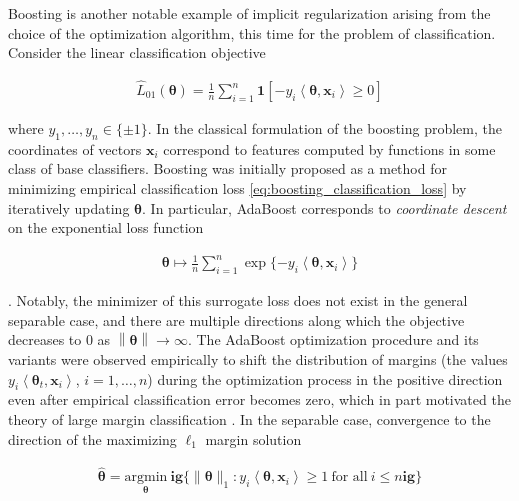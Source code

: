 Boosting is another notable example of implicit regularization arising from the choice of the optimization algorithm, this time for the problem of classification. Consider the linear classification objective

\begin{align}
	\label{eq:boosting_classification_loss}
	\widehat{L}_{01}({\boldsymbol \theta}) = \frac{1}{n}\sum_{i=1}^n
    \ensuremath{\boldsymbol{1}\left[-y_i \left\langle {\boldsymbol \theta}, {\boldsymbol x}_i \right\rangle \ge 0\right]}
\end{align}

where $y_1,\ldots,y_n\in\{\pm1\}$. In the classical formulation of the boosting problem, the coordinates of vectors ${\boldsymbol x}_i$ correspond to features computed by functions in some class of base classifiers. Boosting was initially proposed as a method for minimizing empirical classification loss \eqref{eq:boosting_classification_loss} by iteratively updating ${\boldsymbol \theta}$. In particular, AdaBoost \cite{fs-dgolab-97} corresponds to \emph{coordinate descent} on the exponential loss function

\begin{align}
	\label{eq:explosssurrogate}
	{\boldsymbol \theta}\mapsto\frac{1}{n}\sum_{i=1}^n \exp\{-y_i \left\langle {\boldsymbol \theta},{\boldsymbol x}_i \right\rangle\}
\end{align}

 
\cite{b-ac-98,friedman2001}. Notably, the minimizer of this surrogate loss does not exist in the general separable case, and there are multiple directions along which the objective decreases to $0$ as
$\left\|{\boldsymbol \theta}\right\|\to\infty$. The AdaBoost optimization procedure and its variants were observed empirically to shift the distribution of margins (the values $y_i\left\langle {\boldsymbol \theta}_t,{\boldsymbol x}_i \right\rangle$, $i=1,\ldots,n$)
during the optimization process in the positive direction even after empirical classification error becomes zero, which in part motivated the theory of large margin classification \cite{schapire1998boosting}. In the separable case, convergence to the direction of the maximizing $\ell_1$ margin solution

\begin{align}
	\label{eq:min_norm_linear_l1}
	\widehat{{\boldsymbol \theta}} = \underset{{\boldsymbol \theta}}{\mathrm{argmin}} \  \mathbf{ig}\{\| {\boldsymbol \theta} \|_1: y_i\left\langle {\boldsymbol \theta},{\boldsymbol x}_i \right\rangle \geq 1 ~\text{for all}~ i \leq n \mathbf{ig}\}
\end{align}

